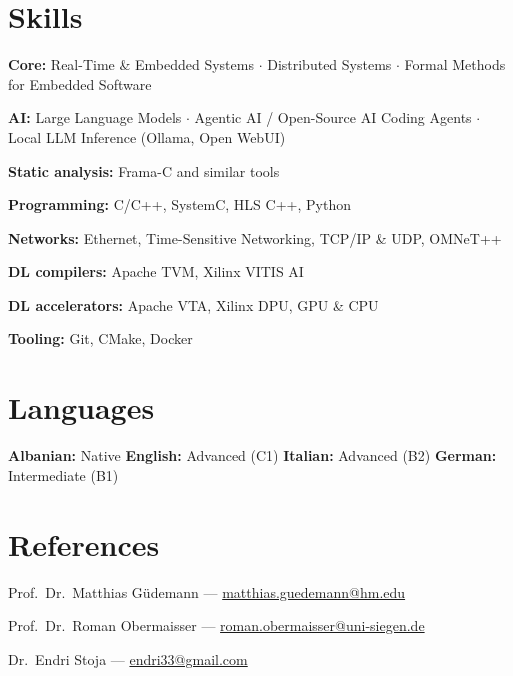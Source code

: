 \documentclass[10pt,a4paper]{article}
\newcommand{\skillrow}[2]{\textbf{#1:} #2\par\vspace{2pt}}
\begin{document}
\section{Skills}
\skillrow{Core}{Real-Time \& Embedded Systems $\cdot$ Distributed Systems $\cdot$ Formal Methods for Embedded Software}
\skillrow{AI}{Large Language Models $\cdot$ Agentic AI / Open-Source AI Coding Agents $\cdot$ Local LLM Inference (Ollama, Open WebUI)}
\skillrow{Static analysis}{Frama-C and similar tools}
\skillrow{Programming}{C/C++, SystemC, HLS C++, Python}
\skillrow{Networks}{Ethernet, Time-Sensitive Networking, TCP/IP \& UDP, OMNeT++}
\skillrow{DL compilers}{Apache TVM, Xilinx VITIS AI}
\skillrow{DL accelerators}{Apache VTA, Xilinx DPU, GPU \& CPU}
\skillrow{Tooling}{Git, CMake, Docker}

\section{Languages}
\textbf{Albanian:} Native \quad\textbf{English:} Advanced (C1) \quad\textbf{Italian:} Advanced (B2) \quad\textbf{German:} Intermediate (B1)

\section{References}
Prof.\ Dr.\ Matthias Güdemann --- \href{mailto:matthias.guedemann@hm.edu}{matthias.guedemann@hm.edu}\par
Prof.\ Dr.\ Roman Obermaisser --- \href{mailto:roman.obermaisser@uni-siegen.de}{roman.obermaisser@uni-siegen.de}\par
Dr.\ Endri Stoja --- \href{mailto:endri33@gmail.com}{endri33@gmail.com}
\end{document}
